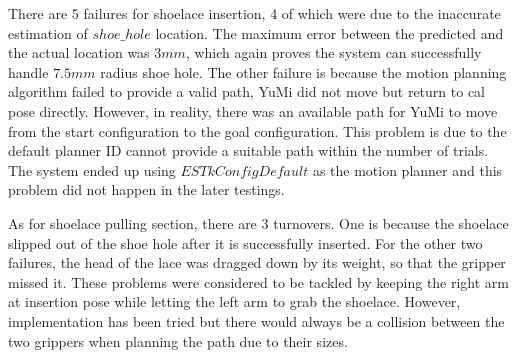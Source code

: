There are 5 failures for shoelace insertion, 4 of which were due to the inaccurate estimation of $shoe\_hole$ location. The maximum error between the predicted and the actual location was $3mm$, which again proves the system can successfully handle $7.5mm$ radius shoe hole. The other failure is because the motion planning algorithm failed to provide a valid path, YuMi did not move but return to cal pose directly. However, in reality, there was an available path for YuMi to move from the start configuration to the goal configuration. This problem is due to the default planner ID cannot provide a suitable path within the number of trials. The system ended up using $ESTkConfigDefault$ as the motion planner and this problem did not happen in the later testings.

As for shoelace pulling section, there are 3 turnovers. One is because the shoelace slipped out of the shoe hole after it is successfully inserted. For the other two failures, the head of the lace was dragged down by its weight, so that the gripper missed it. These problems were considered to be tackled by keeping the right arm at insertion pose while letting the left arm to grab the shoelace. However, implementation has been tried but there would always be a collision between the two grippers when planning the path due to their sizes. 

